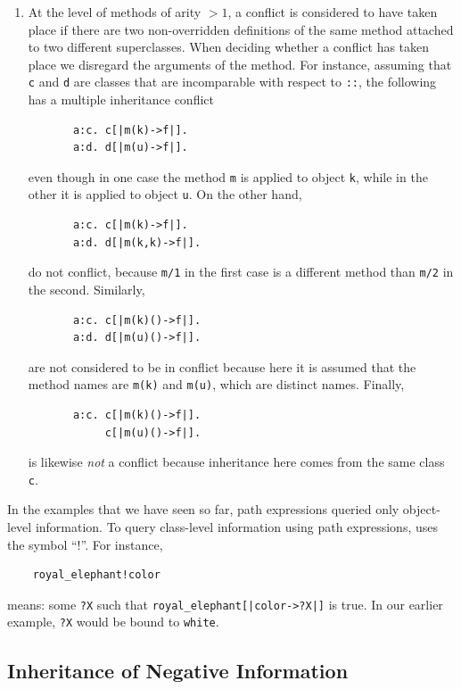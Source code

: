 \documentclass[11pt]{article}
\newcommand{\ERGO}{\mbox{\smaller{\ensuremath{\cal{E}}\smaller{{\sc{RGO}}}}}\xspace}
\newcommand{\FLSYSTEM}{\ERGO}
\begin{document}
\begin{enumerate}
\item At the level of methods of arity $>1$, a conflict is considered to have
  taken place if there are two non-overridden definitions of the same method
  attached to two different superclasses. When deciding whether a conflict
  has taken place we disregard the arguments of the method. For instance,
  assuming that \texttt{c} and \texttt{d} are classes that are
  incomparable with
  respect to \texttt{::}, the following has a multiple inheritance conflict 
\begin{verbatim}
       a:c. c[|m(k)->f|].    
       a:d. d[|m(u)->f|].     
\end{verbatim}
  even though in one case
  the method {\tt m} is applied to object {\tt k}, while in the other it is
  applied to object {\tt u}. 
  On the other hand,
\begin{verbatim}
       a:c. c[|m(k)->f|].    
       a:d. d[|m(k,k)->f|].     
\end{verbatim}
  do not conflict, because {\tt m/1} in the first case is a different
  method than {\tt m/2} in the second. Similarly,
\begin{verbatim}
       a:c. c[|m(k)()->f|].    
       a:d. d[|m(u)()->f|].     
\end{verbatim}
  are not considered to be in conflict because here it is assumed that the
  method names are {\tt m(k)} and {\tt m(u)}, which are distinct names.
  Finally,
\begin{verbatim}
       a:c. c[|m(k)()->f|].    
            c[|m(u)()->f|].     
\end{verbatim}
  is likewise \emph{not} a conflict because inheritance here comes from the same
  class \texttt{c}.
\end{enumerate}

In the examples that we have seen so far, path expressions queried only
object-level information. To query class-level information using path
expressions, \FLSYSTEM uses the symbol ``!''. For instance,
\begin{verbatim}
    royal_elephant!color
\end{verbatim}
means: some \texttt{?X}  such that \texttt{royal\_elephant[|color->?X|]} is
true.  In our earlier example, \texttt{?X} would be bound to
\texttt{white}.  

\subsection{Inheritance of Negative Information}
\end{document}
